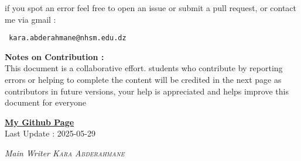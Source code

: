 \documentclass{report}
\begin{document}
\begin{titlepage}
\begin{center}
if you spot an error feel free to open an issue or 
submit a pull request, or contact me  
via gmail : 
\end{center}
\begin{center}
  \normalfont
  \texttt{
    \large kara.abderahmane@nhsm.edu.dz  
    \normalfont
  }
\end{center}
\noindent \textbf{Notes on Contribution : } \\
This document is a collaborative effort.
students who contribute by reporting errors or helping to complete the content
will be credited in the next page as contributors in future versions,
your help is appreciated and helps improve this document for everyone
\normalfont
       \vfill
\begin{center}
       \href{https://github.com/Kapa9102/nvs-lecture}{\textbf{My Github Page}}\\
       \vspace{0.8cm}
       Last Update : 2025-05-29
\end{center}
\begin{tcolorbox}[enhanced, colback=yellow!70!orange!20!white, sharp corners, boxrule=1pt, 
  attach boxed title to top center = {yshift = -10pt, xshift = 0pt}, colbacktitle=yellow!30!orange!20!white, 
  boxed title style = {boxrule=0pt, arc=4pt}, title=\sc\textcolor{black}{Contributors}]
  \begin{center}
  \it Main Writer \hfill \normalfont  \textsc{Kara Abderahmane}  \\
  \end{center}
\end{tcolorbox}
\end{titlepage}

\tableofcontents



























\end{document}
